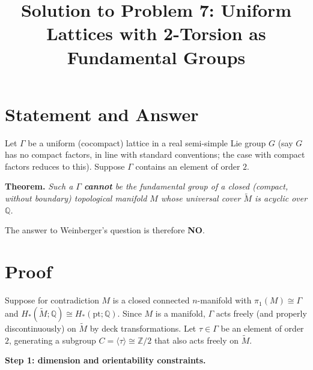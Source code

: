 

\title{Solution to Problem 7: Uniform Lattices with 2-Torsion as Fundamental Groups}
\date{}


\maketitle

\section*{Statement and Answer}

Let $\Gamma$ be a uniform (cocompact) lattice in a real semi-simple Lie group $G$ (say $G$ has no compact factors, in line with standard conventions; the case with compact factors reduces to this).  Suppose $\Gamma$ contains an element of order $2$.

\medskip
\noindent\textbf{Theorem.}  \emph{Such a $\Gamma$ \textbf{cannot} be the fundamental group of a closed (compact, without boundary) topological manifold $M$ whose universal cover $\widetilde M$ is acyclic over $\mathbb Q$.}

\medskip
\noindent The answer to Weinberger's question is therefore \textbf{NO}.

\section*{Proof}

Suppose for contradiction $M$ is a closed connected $n$-manifold with $\pi_1(M)\cong\Gamma$ and $H_*(\widetilde M;\mathbb Q)\cong H_*(\mathrm{pt};\mathbb Q)$.  Since $M$ is a manifold, $\Gamma$ acts freely (and properly discontinuously) on $\widetilde M$ by deck transformations.  Let $\tau\in\Gamma$ be an element of order $2$, generating a subgroup $C=\langle\tau\rangle\cong\mathbb Z/2$ that also acts freely on $\widetilde M$.

\medskip
\noindent\textbf{Step 1: dimension and orientability constraints.}

